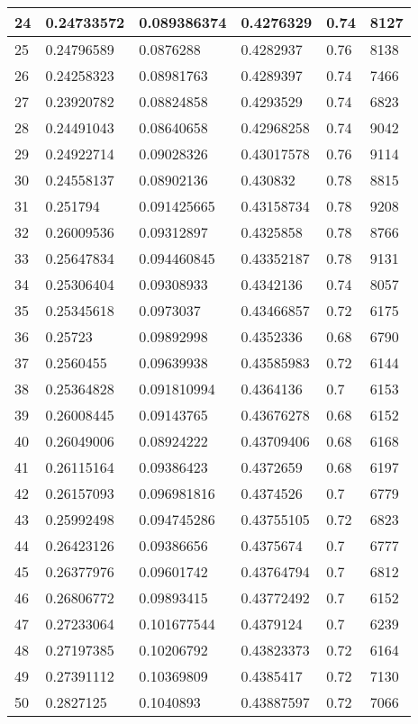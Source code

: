 \begin{longtable}{|l|l|l|l|l|l|}
24 & 0.24733572 & 0.089386374 & 0.4276329 & 0.74 & 8127 \\ \hline 
25 & 0.24796589 & 0.0876288 & 0.4282937 & 0.76 & 8138 \\ \hline 
26 & 0.24258323 & 0.08981763 & 0.4289397 & 0.74 & 7466 \\ \hline 
27 & 0.23920782 & 0.08824858 & 0.4293529 & 0.74 & 6823 \\ \hline 
28 & 0.24491043 & 0.08640658 & 0.42968258 & 0.74 & 9042 \\ \hline 
29 & 0.24922714 & 0.09028326 & 0.43017578 & 0.76 & 9114 \\ \hline 
30 & 0.24558137 & 0.08902136 & 0.430832 & 0.78 & 8815 \\ \hline 
31 & 0.251794 & 0.091425665 & 0.43158734 & 0.78 & 9208 \\ \hline 
32 & 0.26009536 & 0.09312897 & 0.4325858 & 0.78 & 8766 \\ \hline 
33 & 0.25647834 & 0.094460845 & 0.43352187 & 0.78 & 9131 \\ \hline 
34 & 0.25306404 & 0.09308933 & 0.4342136 & 0.74 & 8057 \\ \hline 
35 & 0.25345618 & 0.0973037 & 0.43466857 & 0.72 & 6175 \\ \hline 
36 & 0.25723 & 0.09892998 & 0.4352336 & 0.68 & 6790 \\ \hline 
37 & 0.2560455 & 0.09639938 & 0.43585983 & 0.72 & 6144 \\ \hline 
38 & 0.25364828 & 0.091810994 & 0.4364136 & 0.7 & 6153 \\ \hline 
39 & 0.26008445 & 0.09143765 & 0.43676278 & 0.68 & 6152 \\ \hline 
40 & 0.26049006 & 0.08924222 & 0.43709406 & 0.68 & 6168 \\ \hline 
41 & 0.26115164 & 0.09386423 & 0.4372659 & 0.68 & 6197 \\ \hline 
42 & 0.26157093 & 0.096981816 & 0.4374526 & 0.7 & 6779 \\ \hline 
43 & 0.25992498 & 0.094745286 & 0.43755105 & 0.72 & 6823 \\ \hline 
44 & 0.26423126 & 0.09386656 & 0.4375674 & 0.7 & 6777 \\ \hline 
45 & 0.26377976 & 0.09601742 & 0.43764794 & 0.7 & 6812 \\ \hline 
46 & 0.26806772 & 0.09893415 & 0.43772492 & 0.7 & 6152 \\ \hline 
47 & 0.27233064 & 0.101677544 & 0.4379124 & 0.7 & 6239 \\ \hline 
48 & 0.27197385 & 0.10206792 & 0.43823373 & 0.72 & 6164 \\ \hline 
49 & 0.27391112 & 0.10369809 & 0.4385417 & 0.72 & 7130 \\ \hline 
50 & 0.2827125 & 0.1040893 & 0.43887597 & 0.72 & 7066 \\ \hline 
\end{longtable}